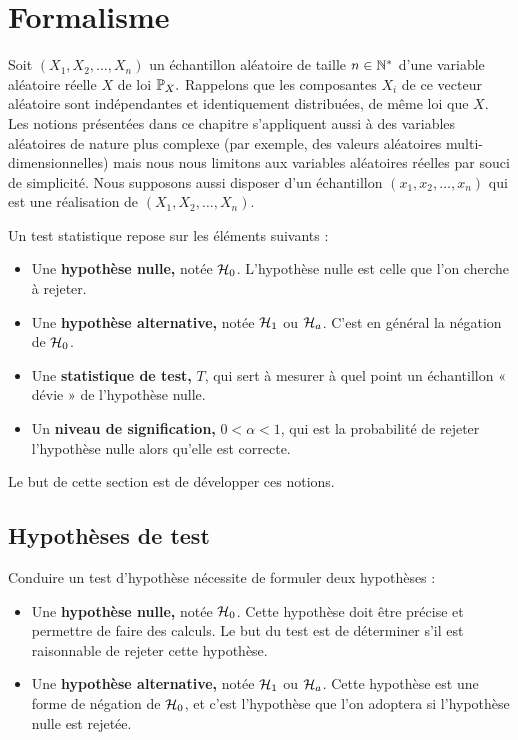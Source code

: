 \section{Formalisme}
\label{sec:formalisme_test}
Soit $(X_1, X_2, \dots, X_n)$ un échantillon aléatoire de taille $n \in \mathbb{N}^*$
d'une variable aléatoire réelle $X$ de loi $\mathbb{P}_X.$ Rappelons que les
composantes $X_i$ de ce vecteur aléatoire sont indépendantes et identiquement
distribuées, de même loi que $X$. Les notions présentées dans ce chapitre
s'appliquent aussi à des variables aléatoires de nature plus complexe (par
exemple, des valeurs aléatoires multi-dimensionnelles) mais nous nous limitons
aux variables aléatoires réelles par souci de simplicité.
Nous supposons aussi disposer d'un échantillon $(x_1, x_2, \dots, x_n)$ qui est
une réalisation de $(X_1, X_2, \dots, X_n)$.

Un test statistique repose sur les éléments suivants :
\begin{itemize}
\item Une \textbf{hypothèse nulle,} notée $\mathcal{H}_0$. L'hypothèse nulle est
  celle que l'on cherche à rejeter.
\item Une \textbf{hypothèse alternative,} notée $\mathcal{H}_1$ ou $\mathcal{H}_a$. C'est en
  général la négation de $\mathcal{H}_0$.
\item Une \textbf{statistique de test,} $T$, qui sert à mesurer à quel point un
  échantillon « dévie » de l'hypothèse nulle.
\item Un \textbf{niveau de signification,} $0 < \alpha < 1$, qui est la
  probabilité de rejeter l'hypothèse nulle alors qu'elle est correcte. 
\end{itemize}

Le but de cette section est de développer ces notions.

\subsection{Hypothèses de test}
Conduire un test d'hypothèse nécessite de formuler deux hypothèses :
\begin{itemize}
\item Une \textbf{hypothèse nulle,} notée $\mathcal{H}_0$. Cette hypothèse doit être
  précise et permettre de faire des calculs. Le but du test est de déterminer
  s'il est raisonnable de rejeter cette hypothèse.
\item Une \textbf{hypothèse alternative,} notée $\mathcal{H}_1$ ou $\mathcal{H}_a$. Cette
  hypothèse est une forme de négation de $\mathcal{H}_0$, et c'est l'hypothèse que l'on
  adoptera si l'hypothèse nulle est rejetée.
\end{itemize}

